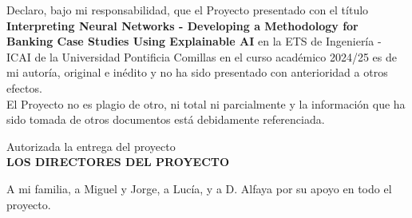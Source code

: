 \documentclass[12pt]{extarticle}
\numberwithin{equation}{section}
\begin{document}
\newpage

{\fontsize{14}{18}\selectfont
    Declaro, bajo mi responsabilidad, que el Proyecto presentado con el título \textbf{Interpreting Neural Networks - Developing a Methodology for Banking Case Studies Using Explainable AI} en la ETS de Ingeniería - ICAI de la Universidad Pontificia Comillas en el curso académico 2024/25 es de mi autoría, original e inédito y no ha sido presentado con anterioridad a otros efectos. \\
    
    El Proyecto no es plagio de otro, ni total ni parcialmente y la información que ha sido tomada de otros documentos está debidamente referenciada.
    
    \vspace{2cm}
    

    
    \vspace{2cm}
    
    \begin{center}
        Autorizada la entrega del proyecto \\
        \vspace{1cm}
        \textbf{LOS DIRECTORES DEL PROYECTO}
    \end{center}
    
    \vspace{1cm}
    
}

\newpage

{\fontsize{17}{20}
    \begin{center}
        {\large A mi familia, a Miguel y Jorge, a Lucía, y a D. Alfaya por su apoyo en todo el proyecto.}
        
    \end{center}
}
\end{document}
